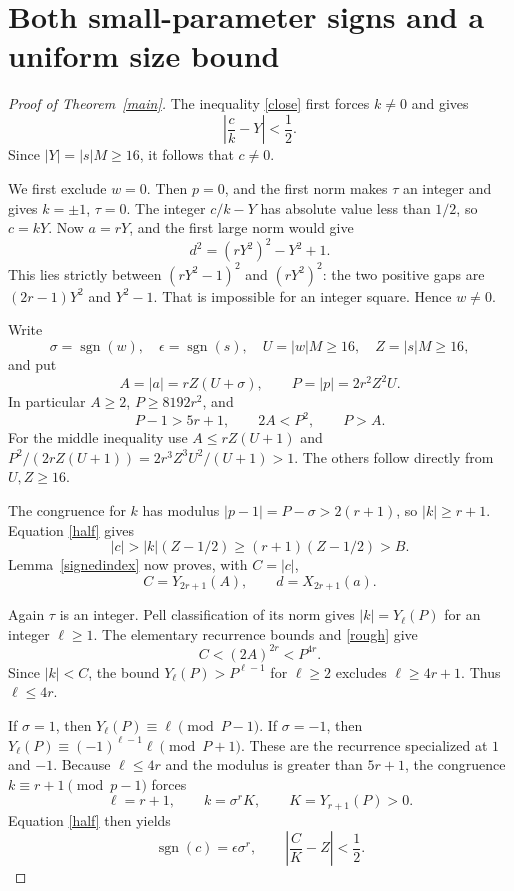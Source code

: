 \documentclass[11pt]{article}
\begin{document}
\section{Both small-parameter signs and a uniform size bound}

\begin{proof}[Proof of Theorem~\ref{main}]
The inequality \eqref{close} first forces \(k\ne0\) and gives
\begin{equation}\label{half}
 \left|\frac ck-Y\right|<\frac12.
\end{equation}
Since \(|Y|=|s|M\ge16\), it follows that \(c\ne0\).

We first exclude \(w=0\). Then \(p=0\), and the first norm makes
\(\tau\) an integer and gives \(k=\pm1\), \(\tau=0\).
The integer \(c/k-Y\) has absolute value less than \(1/2\),
so \(c=kY\). Now \(a=rY\), and the first large norm would give
\[
 d^2=(rY^2)^2-Y^2+1.
\]
This lies strictly between \((rY^2-1)^2\) and \((rY^2)^2\):
the two positive gaps are \((2r-1)Y^2\) and \(Y^2-1\).
That is impossible for an integer square. Hence \(w\ne0\).

Write
\[
 \sigma=\operatorname{sgn}(w),\quad
 \epsilon=\operatorname{sgn}(s),\quad
 U=|w|M\ge16,\quad Z=|s|M\ge16,
\]
and put
\begin{equation}\label{AP}
 A=|a|=rZ(U+\sigma),\qquad
 P=|p|=2r^2Z^2U.
\end{equation}
In particular \(A\ge2\), \(P\ge8192r^2\), and
\begin{equation}\label{rough}
 P-1>5r+1,\qquad 2A<P^2,\qquad P>A.
\end{equation}
For the middle inequality use \(A\le rZ(U+1)\) and
\(P^2/(2rZ(U+1))=2r^3Z^3U^2/(U+1)>1\).
The others follow directly from \(U,Z\ge16\).

The congruence for \(k\) has modulus
\(|p-1|=P-\sigma>2(r+1)\), so \(|k|\ge r+1\).
Equation \eqref{half} gives
\[
 |c|>|k|(Z-1/2)\ge(r+1)(Z-1/2)>B.
\]
Lemma~\ref{signedindex} now proves, with \(C=|c|\),
\begin{equation}\label{largevalues}
 C=Y_{2r+1}(A),\qquad d=X_{2r+1}(a).
\end{equation}

Again \(\tau\) is an integer. Pell classification of its norm gives
\(|k|=Y_\ell(P)\) for an integer \(\ell\ge1\).
The elementary recurrence bounds and \eqref{rough} give
\[
 C<(2A)^{2r}<P^{4r}.
\]
Since \(|k|<C\), the bound
\(Y_\ell(P)>P^{\ell-1}\) for \(\ell\ge2\) excludes
\(\ell\ge4r+1\). Thus \(\ell\le4r\).

If \(\sigma=1\), then
\(Y_\ell(P)\equiv\ell\pmod{P-1}\). If \(\sigma=-1\),
then
\(Y_\ell(P)\equiv(-1)^{\ell-1}\ell\pmod{P+1}\).
These are the recurrence specialized at \(1\) and \(-1\).
Because \(\ell\le4r\) and the modulus is greater than \(5r+1\),
the congruence \(k\equiv r+1\pmod{p-1}\) forces
\begin{equation}\label{smallvalue}
 \ell=r+1,\qquad k=\sigma^r K,
 \qquad K=Y_{r+1}(P)>0.
\end{equation}
Equation \eqref{half} then yields
\begin{equation}\label{signc}
 \operatorname{sgn}(c)=\epsilon\sigma^r,
 \qquad \left|\frac CK-Z\right|<\frac12.
\end{equation}


\end{proof}
\end{document}

